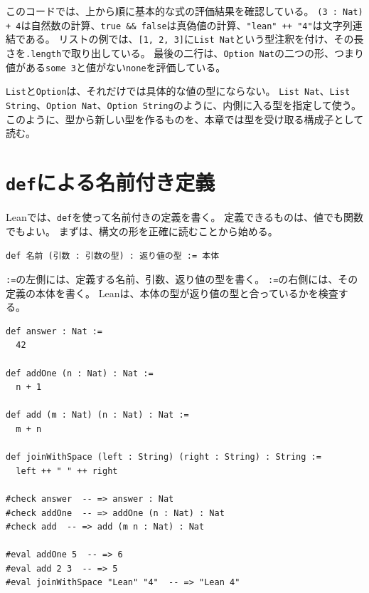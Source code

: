 このコードでは、上から順に基本的な式の評価結果を確認している。
\texttt{(3 : Nat) + 4}は自然数の計算、\texttt{true \&\& false}は真偽値の計算、\texttt{"lean" ++ "4"}は文字列連結である。
リストの例では、\texttt{[1, 2, 3]}に\texttt{List Nat}という型注釈を付け、その長さを\texttt{.length}で取り出している。
最後の二行は、\texttt{Option Nat}の二つの形、つまり値がある\texttt{some 3}と値がない\texttt{none}を評価している。

\begin{leanbox}
\texttt{List}と\texttt{Option}は、それだけでは具体的な値の型にならない。
\texttt{List Nat}、\texttt{List String}、\texttt{Option Nat}、\texttt{Option String}のように、内側に入る型を指定して使う。
このように、型から新しい型を作るものを、本章では型を受け取る構成子として読む。
\end{leanbox}

\section{\texttt{def}による名前付き定義}

Leanでは、\texttt{def}を使って名前付きの定義を書く。
定義できるものは、値でも関数でもよい。
まずは、構文の形を正確に読むことから始める。

\begin{center}
\texttt{def 名前 (引数 : 引数の型) : 返り値の型 := 本体}
\end{center}

\texttt{:=}の左側には、定義する名前、引数、返り値の型を書く。
\texttt{:=}の右側には、その定義の本体を書く。
Leanは、本体の型が返り値の型と合っているかを検査する。

\begin{listing}[htbp]
\begin{verbatim}
def answer : Nat :=
  42

def addOne (n : Nat) : Nat :=
  n + 1

def add (m : Nat) (n : Nat) : Nat :=
  m + n

def joinWithSpace (left : String) (right : String) : String :=
  left ++ " " ++ right

#check answer  -- => answer : Nat
#check addOne  -- => addOne (n : Nat) : Nat
#check add  -- => add (m n : Nat) : Nat

#eval addOne 5  -- => 6
#eval add 2 3  -- => 5
#eval joinWithSpace "Lean" "4"  -- => "Lean 4"
\end{verbatim}
\caption{\texttt{def}による値と関数の定義}
\label{lst:ch01-def-basics}
\end{listing}

